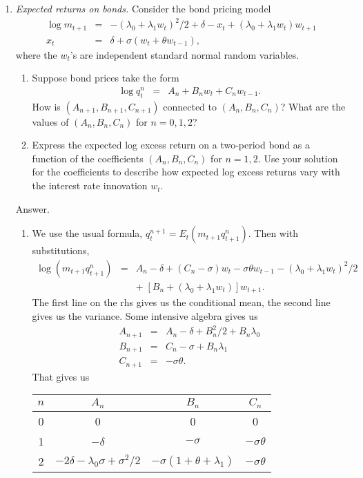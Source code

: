 \documentclass[11pt]{article}
\begin{document}
\begin{enumerate}
\begin{enumerate}
\end{enumerate}

\item  {\it Expected returns on bonds.\/}
Consider the bond pricing model
\begin{eqnarray*}
    \log m_{t+1} &=& - (\lambda_0 + \lambda_1 w_t)^2/2 + \delta - x_t
            + (\lambda_0 + \lambda_1 w_t) w_{t+1} \\
            x_{t} &=& \delta + \sigma (w_t + \theta w_{t-1}) ,
\end{eqnarray*}
where the $w_t$'s are  independent standard normal random variables.
%
\begin{enumerate}
\item Suppose bond prices take the form
\begin{eqnarray*}
    \log q^n_t &=& A_n + B_n w_t + C_n w_{t-1} .
\end{eqnarray*}
How is $(A_{n+1},B_{n+1},C_{n+1})$ connected to $(A_{n},B_{n},C_{n})$?
What are the values of $(A_{n},B_{n},C_{n})$ for $n=0,1,2$?
\item Express the expected log excess return on a two-period bond as a function
of the coefficients $(A_{n},B_{n},C_{n})$ for $n=1,2$.
Use your solution for the coefficients to describe how expected log excess returns vary with the
interest rate innovation $w_t$.
\end{enumerate}
%
Answer.
\begin{enumerate}
\item We use the usual formula,
$ q^{n+1}_t = E_t (m_{t+1} q^n_{t+1})$.
Then with substitutions,
\begin{eqnarray*}
    \log (m_{t+1} q^n_{t+1}) &=& A_n - \delta + (C_n-\sigma) w_t - \sigma\theta w_{t-1}
            - (\lambda_0 + \lambda_1 w_t)^2/2 \\
            && + \; [B_n + (\lambda_0 + \lambda_1 w_t)] w_{t+1} .
\end{eqnarray*}
The first line on the rhs gives us the conditional mean, the second line gives us the variance.
Some intensive algebra gives us
\begin{eqnarray*}
    A_{n+1} &=& A_n - \delta + B_n^2/2 + B_n \lambda_0 \\
    B_{n+1} &=& C_n - \sigma + B_n \lambda_1 \\
    C_{n+1} &=& - \sigma \theta .
\end{eqnarray*}
That gives us
\begin{center}
\begin{tabular}{cccc}
$n$ & $A_n$ & $B_n$ & $C_n$ \\
\midrule
0 & 0 & 0 & 0 \\
1 & $-\delta$ & $-\sigma$ & $-\sigma \theta$ \\
2 & $- 2\delta -\lambda_0 \sigma + \sigma^2/2$ & $- \sigma (1+\theta+\lambda_1)$ & $-\sigma\theta$
\end{tabular}
\end{center}


\end{enumerate}
\end{enumerate}
\end{document}
